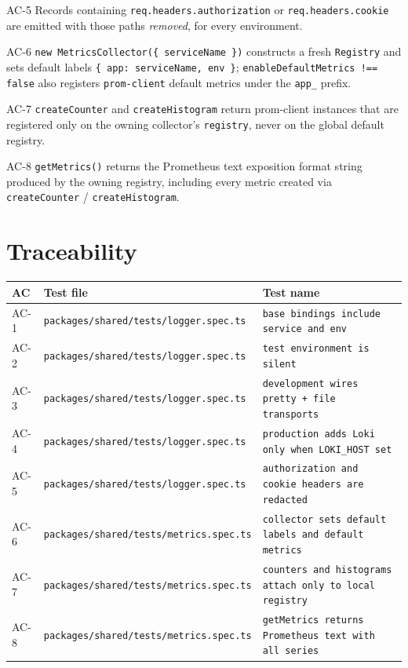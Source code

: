 \begin{ac}{AC-5}
Records containing \texttt{req.headers.authorization} or \texttt{req.headers.cookie} are emitted with those paths \emph{removed}, for every environment.
\end{ac}

\begin{ac}{AC-6}
\texttt{new MetricsCollector(\{ serviceName \})} constructs a fresh \texttt{Registry} and sets default labels \texttt{\{ app: serviceName, env \}}; \texttt{enableDefaultMetrics !== false} also registers \texttt{prom-client} default metrics under the \texttt{app\_} prefix.
\end{ac}

\begin{ac}{AC-7}
\texttt{createCounter} and \texttt{createHistogram} return prom-client instances that are registered only on the owning collector's \texttt{registry}, never on the global default registry.
\end{ac}

\begin{ac}{AC-8}
\texttt{getMetrics()} returns the Prometheus text exposition format string produced by the owning registry, including every metric created via \texttt{createCounter} / \texttt{createHistogram}.
\end{ac}

\section{Traceability}

\begin{center}
\begin{tabular}{@{}lll@{}}
\toprule
AC & Test file & Test name \\
\midrule
AC-1 & \texttt{packages/shared/tests/logger.spec.ts} & \texttt{base bindings include service and env} \\
AC-2 & \texttt{packages/shared/tests/logger.spec.ts} & \texttt{test environment is silent} \\
AC-3 & \texttt{packages/shared/tests/logger.spec.ts} & \texttt{development wires pretty + file transports} \\
AC-4 & \texttt{packages/shared/tests/logger.spec.ts} & \texttt{production adds Loki only when LOKI\_HOST set} \\
AC-5 & \texttt{packages/shared/tests/logger.spec.ts} & \texttt{authorization and cookie headers are redacted} \\
AC-6 & \texttt{packages/shared/tests/metrics.spec.ts} & \texttt{collector sets default labels and default metrics} \\
AC-7 & \texttt{packages/shared/tests/metrics.spec.ts} & \texttt{counters and histograms attach only to local registry} \\
AC-8 & \texttt{packages/shared/tests/metrics.spec.ts} & \texttt{getMetrics returns Prometheus text with all series} \\
\bottomrule
\end{tabular}
\end{center}

